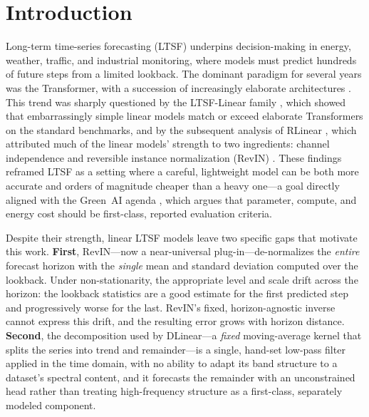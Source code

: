 \section{Introduction}
\label{sec:intro}

Long-term time-series forecasting (LTSF) underpins decision-making in energy,
weather, traffic, and industrial monitoring, where models must predict hundreds
of future steps from a limited lookback. The dominant paradigm for several years
was the Transformer, with a succession of increasingly elaborate architectures
\citep{zhou2021informer,wu2021autoformer,zhou2022fedformer,nie2023patchtst}.
This trend was sharply questioned by the LTSF-Linear family
\citep{zeng2023dlinear}, which showed that embarrassingly simple linear models
match or exceed elaborate Transformers on the standard benchmarks, and by the
subsequent analysis of RLinear \citep{li2023rlinear}, which attributed much of
the linear models' strength to two ingredients: channel independence and
reversible instance normalization (RevIN) \citep{kim2022revin}. These findings
reframed LTSF as a setting where a careful, lightweight model can be both more
accurate and orders of magnitude cheaper than a heavy one---a goal directly
aligned with the Green~AI agenda \citep{schwartz2020greenai,strubell2019energy},
which argues that parameter, compute, and energy cost should be first-class,
reported evaluation criteria.

Despite their strength, linear LTSF models leave two specific gaps that motivate
this work. \textbf{First}, RevIN---now a near-universal plug-in---de-normalizes
the \emph{entire} forecast horizon with the \emph{single} mean and standard
deviation computed over the lookback. Under non-stationarity, the appropriate
level and scale drift across the horizon: the lookback statistics are a good
estimate for the first predicted step and progressively worse for the last.
RevIN's fixed, horizon-agnostic inverse cannot express this drift, and the
resulting error grows with horizon distance. \textbf{Second}, the decomposition
used by DLinear---a \emph{fixed} moving-average kernel that splits the series
into trend and remainder---is a single, hand-set low-pass filter applied in the
time domain, with no ability to adapt its band structure to a dataset's spectral
content, and it forecasts the remainder with an unconstrained head rather than
treating high-frequency structure as a first-class, separately modeled
component.

